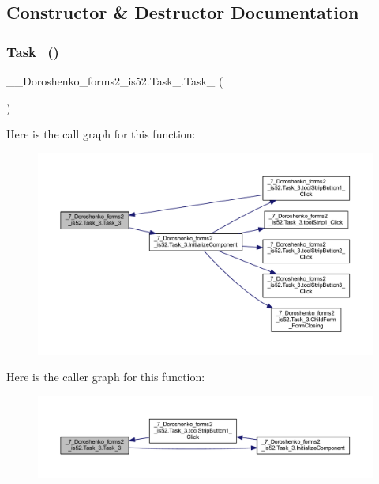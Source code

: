 \subsection{Constructor \& Destructor Documentation}
\hypertarget{class__7___doroshenko__forms2__is52_1_1_task__3_a2f9a46fcf9e46005111d857b5ac6ab6b}{}\label{class__7___doroshenko__forms2__is52_1_1_task__3_a2f9a46fcf9e46005111d857b5ac6ab6b} 
\subsubsection{\texorpdfstring{Task\+\_()}{Task\_3()}}
{\footnotesize\ttfamily \+\_\+\_\+\+Doroshenko\+\_\+forms2\+\_\+is52.\+Task\+\_.\+Task\+\_ (\begin{DoxyParamCaption}{ }\end{DoxyParamCaption})}

Here is the call graph for this function\+:
\nopagebreak
\begin{figure}[H]
\begin{center}
\leavevmode
\includegraphics[width=350pt]{class__7___doroshenko__forms2__is52_1_1_task__3_a2f9a46fcf9e46005111d857b5ac6ab6b_cgraph}
\end{center}
\end{figure}
Here is the caller graph for this function\+:
\nopagebreak
\begin{figure}[H]
\begin{center}
\leavevmode
\includegraphics[width=350pt]{class__7___doroshenko__forms2__is52_1_1_task__3_a2f9a46fcf9e46005111d857b5ac6ab6b_icgraph}
\end{center}
\end{figure}


